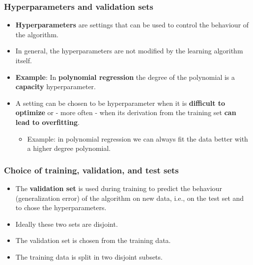 \documentclass[notes]{beamer}          %
\newif\iffull
\begin{document}
\begin{frame}
\frametitle{Hyperparameters and validation sets}
    \begin{itemize}
        \item {\bf Hyperparameters} are settings that can be used to control the behaviour of the algorithm.
        \item In general, the hyperparameters are not modified by the learning algorithm itself.
        \item {\bf Example}: In {\bf polynomial regression} the degree of the polynomial is a {\bf capacity} hyperparameter.
        \item A setting can be chosen to be hyperparameter when it is {\bf difficult to optimize} or - more often - when its derivation from the training set {\bf can lead to overfitting}.
        \begin{itemize}
            \item Example: in polynomial regression we can always fit the data better with a higher degree polynomial.
        \end{itemize}
    \end{itemize}
\end{frame}


\begin{frame}
\frametitle{Choice of training, validation, and test sets}
    \begin{itemize}
        \item The {\bf validation set} is used during training to predict the behaviour (generalization error) of the algorithm on new data, i.e., on the {test set} and to chose the hyperparameters.
        \item Ideally these two sets are disjoint.
        \item The validation set is chosen from the training data.
        \item The training data is split in two disjoint subsets.
        \iffull
        \item One subset is used to learn the parameters of the algorithm and the other is the validation set.
        \item The subset used to learn the parameters is still typically called a {\bf training set}.
        \fi
    \end{itemize}
\end{frame}
\end{document}
